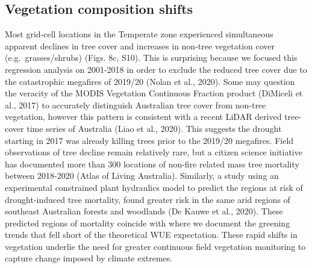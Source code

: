 \documentclass[gc, manuscript]{copernicus}
\begin{document}
\subsection{Vegetation composition shifts}

Most grid-cell locations in the Temperate zone experienced simultaneous
apparent declines in tree cover and increases in non-tree vegetation
cover (e.g.~grasses/shrubs) (Figs. 8c, S10). This is surprising because
we focused this regression analysis on 2001-2018 in order to exclude the
reduced tree cover due to the catastrophic megafires of 2019/20 (Nolan
et al., 2020). Some may question the veracity of the MODIS Vegetation
Continuous Fraction product (DiMiceli et al., 2017) to accurately
distinguish Australian tree cover from non-tree vegetation, however this
pattern is consistent with a recent LiDAR derived tree-cover time series
of Australia (Liao et al., 2020). This suggests the drought starting in
2017 was already killing trees prior to the 2019/20 megafires. Field
observations of tree decline remain relatively rare, but a citizen
science initiative has documented more than 300 locations of non-fire
related mass tree mortality between 2018-2020 (Atlas of Living
Australia). Similarly, a study using an experimental constrained plant
hydraulics model to predict the regions at risk of drought-induced tree
mortality, found greater risk in the same arid regions of southeast
Australian forests and woodlands (De Kauwe et al., 2020). These
predicted regions of mortality coincide with where we document the
greening trends that fell short of the theoretical WUE expectation.
These rapid shifts in vegetation underlie the need for greater
continuous field vegetation monitoring to capture change imposed by
climate extremes.
\end{document}
